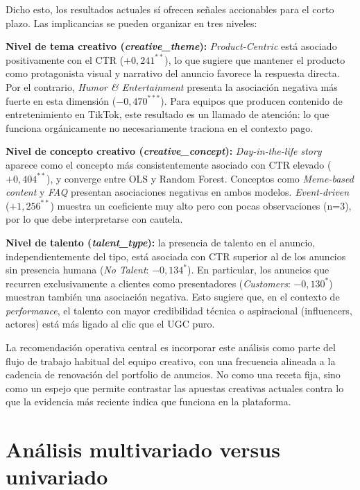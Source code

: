 \documentclass[12pt, a4paper]{report}
\begin{document}
Dicho esto, los resultados actuales sí ofrecen señales accionables para el corto plazo.
Las implicancias se pueden organizar en tres niveles:

\textbf{Nivel de tema creativo (\textit{creative\_theme}):} \textit{Product-Centric} está asociado
positivamente con el CTR ($+0{,}241^{**}$), lo que sugiere que mantener el producto como
protagonista visual y narrativo del anuncio favorece la respuesta directa. Por el contrario,
\textit{Humor \& Entertainment} presenta la asociación negativa más fuerte en esta dimensión
($-0{,}470^{***}$). Para equipos que producen contenido de entretenimiento en TikTok, este
resultado es un llamado de atención: lo que funciona orgánicamente no necesariamente
traciona en el contexto pago.

\textbf{Nivel de concepto creativo (\textit{creative\_concept}):} \textit{Day-in-the-life story}
aparece como el concepto más consistentemente asociado con CTR elevado ($+0{,}404^{**}$),
y converge entre OLS y Random Forest. Conceptos como \textit{Meme-based content} y
\textit{FAQ} presentan asociaciones negativas en ambos modelos. \textit{Event-driven}
($+1{,}256^{**}$) muestra un coeficiente muy alto pero con pocas observaciones (n=3), por
lo que debe interpretarse con cautela.

\textbf{Nivel de talento (\textit{talent\_type}):} la presencia de talento en el anuncio,
independientemente del tipo, está asociada con CTR superior al de los anuncios sin
presencia humana (\textit{No Talent}: $-0{,}134^{*}$). En particular, los anuncios que
recurren exclusivamente a clientes como presentadores (\textit{Customers}: $-0{,}130^{*}$)
muestran también una asociación negativa. Esto sugiere que, en el contexto de
\textit{performance}, el talento con mayor credibilidad técnica o aspiracional (influencers,
actores) está más ligado al clic que el UGC puro.

La recomendación operativa central es incorporar este análisis como parte del flujo de
trabajo habitual del equipo creativo, con una frecuencia alineada a la cadencia de
renovación del portfolio de anuncios. No como una receta fija, sino como un espejo que
permite contrastar las apuestas creativas actuales contra lo que la evidencia más reciente
indica que funciona en la plataforma.

\section{Análisis multivariado versus univariado}
\end{document}
